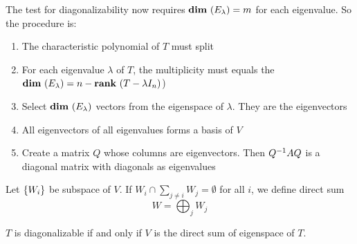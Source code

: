 The test for diagonalizability now requires $\dimension{E_\lambda} = m$ for each eigenvalue. So the procedure is:
\begin{enumerate}
    \item The characteristic polynomial of $T$ must split
    \item For each eigenvalue $\lambda$ of $T$, the multiplicity must equals the $\dimension{E_\lambda} = n - \rank{T - \lambda I_n}$)
    \item Select $\dimension{E_\lambda}$ vectors from the eigenspace of $\lambda$. They are the eigenvectors
    \item All eigenvectors of all eigenvalues forms a basis of $V$
    \item Create a matrix $Q$ whose columns are eigenvectors. Then ${Q}^{-1} A Q$ is a diagonal matrix with diagonals as eigenvalues
\end{enumerate}

\begin{definition}
    Let $\set{W_i}$ be subspace of $V$. If $\displaystyle W_i \cap \sum_{j \neq i} W_j = \emptyset$ for all $i$, we define direct sum
    \begin{equation}
        W = \bigoplus_{j} W_j
    \end{equation}
\end{definition}

\begin{theorem}
    $T$ is diagonalizable if and only if $V$ is the direct sum of eigenspace of $T$.    
\end{theorem}



